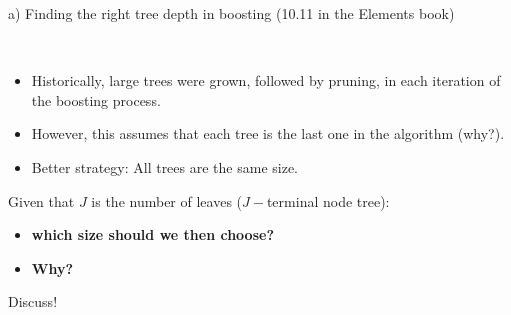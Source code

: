 \documentclass[
  10pt,
  ignorenonframetext,
]{beamer}
\providecommand{\tightlist}{%
  \setlength{\itemsep}{0pt}\setlength{\parskip}{0pt}}
\begin{document}
\begin{frame}
\begin{block}{a) Finding the right tree depth in boosting}
\label{a-finding-the-right-tree-depth-in-boosting}
(10.11 in the Elements book)

\(~\)

\begin{itemize}
\tightlist
\item
  Historically, large trees were grown, followed by pruning, in each
  iteration of the boosting process.
\end{itemize}

\vspace{2mm}

\begin{itemize}
\tightlist
\item
  However, this assumes that each tree is the last one in the algorithm
  (why?).
\end{itemize}

\vspace{2mm}

\begin{itemize}
\tightlist
\item
  Better strategy: All trees are the same size.
\end{itemize}

\pause

\vspace{6mm}

Given that \(J\) is the number of leaves (\(J-\)terminal node tree):

\vspace{2mm}

\begin{itemize}
\tightlist
\item
  \textbf{which size should we then choose?}
\item
  \textbf{Why?}
\end{itemize}

\vspace{2mm}

Discuss!
\end{block}
\end{frame}
\end{document}

